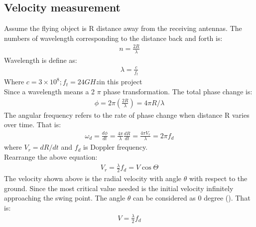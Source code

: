 \subsection{Velocity measurement}
Assume the flying object is R distance away from the receiving antennas. The numbers of wavelength corresponding to the distance back and forth is:
\begin{align}
n=\frac{2 R}{\lambda}    
\end{align}
Wavelength is define as:
\begin{align}
\lambda=\frac{c}{f_{t}}
\end{align}
Where $c=3 \times 10^{8} ; f_{t}=24 G H z$in this project\\
Since a wavelength means a 2 $\pi$ phase transformation. The total phase change is:
\begin{align}
\phi=2 \pi\left(\frac{2 R}{\lambda}\right)=4 \pi R / \lambda
\end{align}
The angular frequency refers to the rate of phase change when distance R varies over time. That is:
\begin{align}
\omega_{d}=\frac{d \phi}{d t}=\frac{4 \pi}{\lambda} \frac{d R}{d t}=\frac{4 \pi V_{r}}{\lambda}=2 \pi f_{d}
\end{align}
where $V_{r}=d R / d t$ and $f_{d}$ is Doppler frequency.\\
Rearrange the above equation:
\begin{align}
V_{r}=\frac{\lambda}{2} f_{d}=V \cos \Theta
\end{align}
The velocity shown above is the radial velocity with angle $\theta$ with respect to the ground. Since the most critical value needed is the initial velocity infinitely approaching the swing point. The angle $\theta$ can be considered as 0 degree (\cite{martin2012evaluation}). That is:
\begin{align}
V=\frac{\lambda}{2} f_{d}
\end{align}


